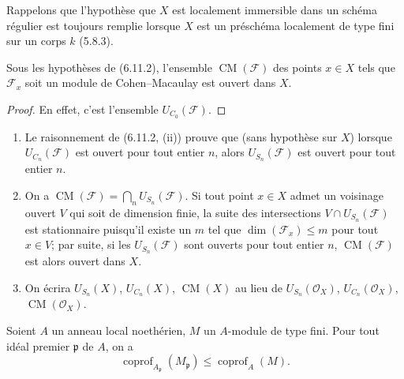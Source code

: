 Rappelons que l'hypothèse que $X$ est localement immersible dans un schéma
régulier est toujours remplie lorsque $X$ est un préschéma localement de
type fini sur un corps $k$ (5.8.3).

\begin{corollary}[6.11.3]
\label{IV.2.s6.11.3-fr}
Sous les hypothèses de (6.11.2), l'ensemble $\operatorname{CM}(\mathcal F)$
des points $x\in X$ tels que $\mathcal F_x$ soit un module de
Cohen--Macaulay est ouvert dans $X$.
\end{corollary}

\begin{proof}
En effet, c'est l'ensemble $U_{C_0}(\mathcal F)$.
\end{proof}

\begin{remarks}[6.11.4]
\label{IV.2.s6.11.4-fr}
\begin{enumerate}
\item[(i)] Le raisonnement de (6.11.2, (ii)) prouve que (sans hypothèse sur
$X$) lorsque $U_{C_n}(\mathcal F)$ est ouvert pour tout entier $n$, alors
$U_{S_n}(\mathcal F)$ est ouvert pour tout entier $n$.
\item[(ii)] On a
$\operatorname{CM}(\mathcal F)=\bigcap_nU_{S_n}(\mathcal F)$. Si tout point
$x\in X$ admet un voisinage ouvert $V$ qui soit de dimension finie, la
suite des intersections $V\cap U_{S_n}(\mathcal F)$ est stationnaire
puisqu'il existe un $m$ tel que $\dim(\mathcal F_x)\leq m$ pour tout
$x\in V$; par suite, si les $U_{S_n}(\mathcal F)$ sont ouverts pour tout
entier $n$, $\operatorname{CM}(\mathcal F)$ est alors ouvert dans $X$.
\item[(iii)] On écrira $U_{S_n}(X)$, $U_{C_n}(X)$,
$\operatorname{CM}(X)$ au lieu de $U_{S_n}(\mathcal O_X)$,
$U_{C_n}(\mathcal O_X)$, $\operatorname{CM}(\mathcal O_X)$.
\end{enumerate}
\end{remarks}

\begin{proposition}[6.11.5]
\label{IV.2.s6.11.5-fr}
Soient $A$ un anneau local noethérien, $M$ un $A$-module de type fini. Pour
tout idéal premier $\mathfrak p$ de $A$, on a
\begin{equation}
\operatorname{coprof}_{A_{\mathfrak p}}(M_{\mathfrak p})\leq
\operatorname{coprof}_A(M).
\tag{6.11.5.1}\label{IV.2.s6.11.5.1-fr}
\end{equation}
\end{proposition}

